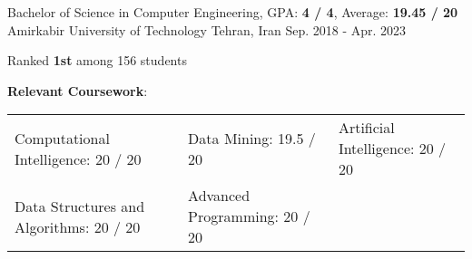 \begin{cventries}
  \cventry
    {Bachelor of Science in Computer Engineering, GPA: \textbf{4 / 4}, Average: \textbf{19.45 / 20}} %
    {Amirkabir University of Technology} %
    {Tehran, Iran} %
    {Sep. 2018 - Apr. 2023} %
    {
      \begin{cvitems}
        \item{Ranked \textbf{1st} among 156 students}
        \item{
          \textbf{Relevant Coursework}:
          \smallskip
          \begin{adjustwidth}{4mm}{}
            \begin{tabular}{l@{\hskip 5mm}l@{\hskip 5mm}l}
              Computational Intelligence: 20 / 20     & Data Mining: 19.5 / 20        & Artificial Intelligence: 20 / 20 \\
Data Structures and Algorithms: 20 / 20 & Advanced Programming: 20 / 20 &      

\end{tabular}
\end{adjustwidth}}
\end{cvitems}}
\end{cventries}

